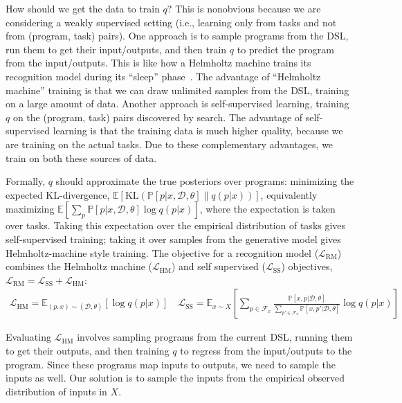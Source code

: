 \documentclass{article}
\newcommand{\system}{\textsc{CoCoSea}~}
\newcommand{\expect}{\mathds{E}} %
\newcommand{\probability}{\mathds{P}} %
\begin{document}
How should we get the data to train $q$?
This is nonobvious  because we are considering a weakly supervised setting (i.e., learning only from tasks and not from (program, task) pairs).
One approach is to sample programs from the DSL,
run them to get their input/outputs,
and then train $q$ to predict the program from the input/outputs.
This is like how a Helmholtz machine
trains its recognition model during its ``sleep'' phase~\cite{dayan1995helmholtz}.
The advantage of ``Helmholtz machine'' training is that
we can draw unlimited samples from the DSL,
training on a large amount of data.
Another approach is
 self-supervised learning,
training $q$ on the (program, task)
pairs discovered by search.
The advantage of self-supervised learning
is that the training data is much higher quality,
because we are training on the actual tasks.
Due to these complementary advantages,
we train on both these sources of data.

Formally, $q$ should approximate the true posteriors over programs: minimizing the expected KL-divergence, $  \expect\left[\text{KL}\left(\probability[p|x,\mathcal{D},\theta]\|q(p|x) \right) \right]$,
 equivalently maximizing $  \expect[\sum_p\probability[p|x,\mathcal{D},\theta]\log q(p|x) ]$,
 where the expectation is taken over tasks. Taking this expectation over the empirical distribution of tasks gives self-supervised training; taking it over samples from the generative model gives  Helmholtz-machine style training.
 The  objective for a recognition model ($\mathcal{L}_{\text{RM}}$) combines the Helmholtz machine ($\mathcal{L}_{\text{HM}}$) and self supervised ($\mathcal{L}_{\text{SS}}$) objectives, $\mathcal{L}_{\text{RM}} = \mathcal{L}_\text{SS} + \mathcal{L}_\text{HM}$:
\begin{align}\nonumber
\mathcal{L}_{\text{HM}} = \expect_{(p,x)\sim(\mathcal{D},\theta) }\left[\log q(p|x)\right]\quad
\mathcal{L}_{\text{SS}} = \expect_{x\sim X}\left[\sum_{p\in \mathcal{F}_x}
  \frac{\probability\left[x,p|\mathcal{D},\theta \right]}{\sum_{p'\in \mathcal{F}_x}\probability\left[x,p'|\mathcal{D},\theta \right]}\log q(p|x)\right]
\end{align}

Evaluating $\mathcal{L}_{\text{HM}}$ involves sampling programs from
the current DSL, running them to get their outputs,
and then training $q$ to regress from the input/outputs to the program.
Since these programs map inputs to outputs,
we need to sample the inputs as well.
Our solution is to sample the inputs
from the empirical observed distribution of inputs in $X$.
\end{document}

